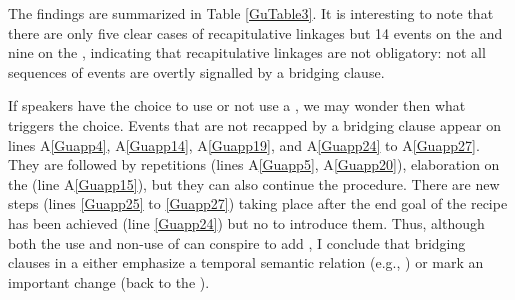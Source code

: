 \documentclass[output=paper]{LSP/langsci}
\begin{document}
The findings are summarized in Table \ref{GuTable3}. It is interesting to note that there are only five clear cases of recapitulative linkages but 14 events on the  and nine on the , indicating that recapitulative linkages are not obligatory: not all sequences of events are overtly signalled by a bridging clause. 

If speakers have the choice to use or not use a , we may wonder then what triggers the choice. Events that are not recapped by a bridging clause appear on lines A\ref{Guapp4}, A\ref{Guapp14}, A\ref{Guapp19}, and A\ref{Guapp24} to A\ref{Guapp27}.  They are followed by repetitions (lines A\ref{Guapp5}, A\ref{Guapp20}), elaboration on the  (line A\ref{Guapp15}), but they can also continue the procedure. There are new steps (lines \ref{Guapp25} to \ref{Guapp27}) taking place after the end goal of the recipe has been achieved  (line \ref{Guapp24}) but no  to introduce them. Thus, although both the use and non-use of  can conspire to add , I conclude that bridging clauses in a  either emphasize a temporal semantic relation (e.g., ) or mark an important  change (back to the ). 
\end{document}
